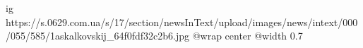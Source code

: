  
 
 
 
 

\ifcmt
  ig https://s.0629.com.ua/s/17/section/newsInText/upload/images/news/intext/000/055/585/1askalkovskij_64f0fdf32c2b6.jpg
  @wrap center
  @width 0.7
\fi
